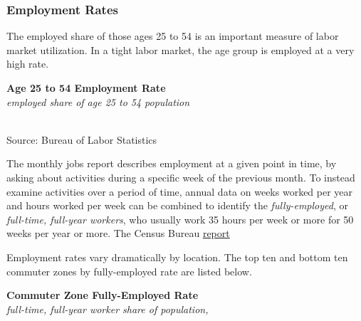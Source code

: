\documentclass{report}
\makeatletter
\newcommand{\tbllink}[1]{\href{https://raw.githubusercontent.com/bdecon/US-chartbook/master/chartbook/data/#1}{\faTable}}
\newcommand*\short[1]{\expandafter\@gobbletwo\number\numexpr#1\relax}
\newcommand{\dateaxisticks}{
		date coordinates in=x, axis line style={draw=none},
		xmax={2023-02-15},
		max space between ticks=40,	    
		xtick={{1990-01-01}, {1992-01-01}, {1994-01-01}, 
			{1996-01-01}, {1998-01-01}, {2000-01-01}, 
			{2002-01-01}, {2004-01-01}, {2006-01-01},
			{2008-01-01}, {2010-01-01}, {2012-01-01}, {2014-01-01},
		    {2016-01-01}, {2018-01-01}, {2020-01-01}, {2022-01-01}, 
		    {2024-01-01}, {2026-01-01}},
		minor xtick={{1989-01-01}, {1991-01-01}, {1993-01-01},
			{1995-01-01}, {1997-01-01}, {1999-01-01}, 
			{2001-01-01}, {2003-01-01}, {2005-01-01}, {2007-01-01},
		    {2009-01-01}, {2011-01-01}, {2013-01-01}, {2015-01-01},
		    {2017-01-01}, {2019-01-01}, {2021-01-01}, {2023-01-01}, 
		    {2025-01-01}, {2027-01-01}},
		enlarge y limits={0.06}, enlarge x limits={0.01},
		}
\newcommand{\bbar}[2]{extra #1 ticks = {{#2}}, extra #1 tick labels = ,
		extra #1 tick style = {grid=major, grid style={thick, black!25}},}
\newcommand{\stdline}[4]{\addplot[very thick, no markers, color=#1] 
		table [x=#2, y=#3, col sep=comma] {#4};	}
\newcommand{\rbars}{
		\fill[color=black!10] (axis cs:{1990-07-01},\pgfkeysvalueof{/pgfplots/ymin}) rectangle 
			(axis cs:{1991-03-01}, \pgfkeysvalueof{/pgfplots/ymax});
		\fill[color=black!10] (axis cs:{2007-12-01},\pgfkeysvalueof{/pgfplots/ymin}) rectangle 
			(axis cs:{2009-07-01}, \pgfkeysvalueof{/pgfplots/ymax});
		\fill[color=black!10] (axis cs:{2001-03-01},\pgfkeysvalueof{/pgfplots/ymin}) rectangle 
			(axis cs:{2001-11-01}, \pgfkeysvalueof{/pgfplots/ymax});
		\fill[color=black!10] (axis cs:{2020-02-01},\pgfkeysvalueof{/pgfplots/ymin}) rectangle 
			(axis cs:{2020-05-01}, \pgfkeysvalueof{/pgfplots/ymax});}
\makeatother
\begin{document}
{\begin{minipage}{0.76\textwidth}
\subsubsection*{Employment Rates}
\vspace{-0.5mm}
\small The employed share of those ages 25 to 54 is an important measure of labor market utilization. In a tight labor market, the age group is employed at a very high rate.  

\normalsize \textbf{Age 25 to 54 Employment Rate}\\
\footnotesize{\textit{employed share of age 25 to 54 population}}\\
\hspace*{-2mm} \\
\footnotesize{Source: Bureau of Labor Statistics} \hfill \tbllink{epop.csv}
\vspace{1.5mm}

\small The monthly jobs report describes employment at a given point in time, by asking about activities during a specific week of the previous month. To instead examine activities over a period of time, annual data on weeks worked per year and hours worked per week can be combined to identify the \textit{fully-employed}, or \textit{full-time, full-year workers}, who usually work 35 hours per week or more for 50 weeks per year or more. The Census Bureau \href{https://www.census.gov/data/tables/time-series/demo/income-poverty/cps-pinc/pinc-01.html#par_textimage_14}{report} 

Employment rates vary dramatically by location. The top ten and bottom ten commuter zones by fully-employed rate are listed below.
\end{minipage}
\vspace{1mm}

\begin{minipage}{0.52\textwidth}
\normalsize \textbf{Commuter Zone Fully-Employed Rate}\\
\footnotesize{\textit{full-time, full-year worker share of population, }}\\
\vspace{1mm}


\end{minipage}}
\end{document}
